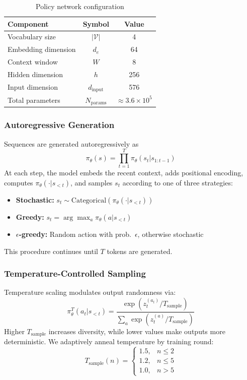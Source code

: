 \documentclass[conference]{IEEEtran}
\begin{document}
\begin{table}[H]
\centering
\caption{Policy network configuration}
\begin{tabular}{lcc}
\hline
\textbf{Component} & \textbf{Symbol} & \textbf{Value} \\
\hline
Vocabulary size & $|\mathcal{V}|$ & 4 \\
Embedding dimension & $d_e$ & 64 \\
Context window & $W$ & 8 \\
Hidden dimension & $h$ & 256 \\
Input dimension & $d_{\text{input}}$ & 576 \\
Total parameters & $N_{\text{params}}$ & $\approx 3.6\times 10^5$ \\
\hline
\end{tabular}
\end{table}

\subsubsection{Autoregressive Generation}

Sequences are generated autoregressively as
\[
\pi_\theta(s) = \prod_{t=1}^{T} \pi_\theta(s_t | s_{1:t-1})
\]
At each step, the model embeds the recent context, adds positional encoding, computes $\pi_\theta(\cdot|s_{<t})$, and samples $s_t$ according to one of three strategies:
\begin{itemize}
    \item \textbf{Stochastic:} $s_t \sim \text{Categorical}(\pi_\theta(\cdot|s_{<t}))$
    \item \textbf{Greedy:} $s_t = \arg\max_a \pi_\theta(a|s_{<t})$
    \item \textbf{$\epsilon$-greedy:} Random action with prob.~$\epsilon$, otherwise stochastic
\end{itemize}
This procedure continues until $T$ tokens are generated.

\subsubsection{Temperature-Controlled Sampling}

Temperature scaling modulates output randomness via:
\[
\pi_\theta^{T}(a_t|s_{<t}) = \frac{\exp(z_t^{(a_t)}/T_{\text{sample}})}{\sum_a \exp(z_t^{(a)}/T_{\text{sample}})}
\]
Higher $T_{\text{sample}}$ increases diversity, while lower values make outputs more deterministic. We adaptively anneal temperature by training round:
\[
T_{\text{sample}}(n) = 
\begin{cases}
1.5, & n \le 2\\
1.2, & n \le 5\\
1.0, & n > 5
\end{cases}
\]
\end{document}

